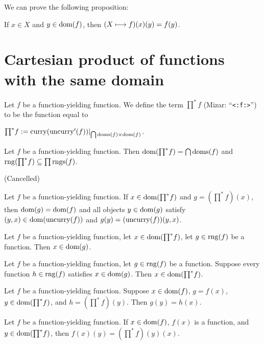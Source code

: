\documentclass{article}
\begin{document}
We can prove the following proposition:
\begin{thm}
\item\label{funct6:28} If $x\in X$ and $y\in\operatorname{dom}(f)$,
  then $(X\longmapsto f)(x)(y)=f(y)$.
\end{thm}

\section{Cartesian product of functions with the same domain}

\begin{definition}
Let $f$ be a function-yielding function.
We define the term ${\prod}^{*}f$ (Mizar: ``\verb#<:f:>#'') to be the
function equal to
\begin{defn}
\item ${\prod}^{*}f := \operatorname{curry}(\operatorname{uncurry}'(f))|_{{\bigcap\operatorname{doms}(f)}\times\operatorname{dom}(f)}$.
\end{defn}
\end{definition}

\begin{thm}
\item\label{funct6:29} Let $f$ be a function-yielding function.
  Then $\operatorname{dom}({\prod}^{*}f)=\bigcap\operatorname{doms}(f)$ and $\operatorname{rng}({\prod}^{*}f)\subseteq\prod\operatorname{rngs}(f)$.
\item\label{funct6:30} (Cancelled)
\item\label{funct6:31} Let $f$ be a function-yielding function.
  If $x\in\operatorname{dom}({\prod}^{*}f)$ and $g=({\prod}^{*}f)(x)$, then
  $\operatorname{dom}(g)=\operatorname{dom}(f)$ and all objects $y\in\operatorname{dom}(g)$ satisfy
  $(y,x)\in\operatorname{dom}(\operatorname{uncurry}(f))$ and $g(y)=(\operatorname{uncurry}(f))(y,x)$.
\item\label{funct6:32} Let $f$ be a function-yielding function, let $x\in\operatorname{dom}({\prod}^{*}f)$,
  let $g\in\operatorname{rng}(f)$ be a function. Then $x\in\operatorname{dom}(g)$.
\item\label{funct6:33} Let $f$ be a function-yielding function, let
  $g\in\operatorname{rng}(f)$ be a function. Suppose every function $h\in\operatorname{rng}(f)$
  satisfies $x\in\operatorname{dom}(g)$.
  Then $x\in\operatorname{dom}({\prod}^{*}f)$.
\item\label{funct6:34} Let $f$ be a function-yielding function. Suppose
  $x\in\operatorname{dom}(f)$, $g=f(x)$, $y\in\operatorname{dom}({\prod}^{*}f)$, and $h=({\prod}^{*}f)(y)$.
  Then $g(y)=h(x)$.
\item\label{funct6:35} Let $f$ be a function-yielding function.
  If $x\in\operatorname{dom}(f)$, $f(x)$ is a function, and $y\in\operatorname{dom}({\prod}^{*}f)$,
  then $f(x)(y)=({\prod}^{*}f)(y)(x)$.
\end{thm}
\end{document}
